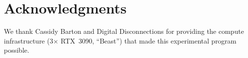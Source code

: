\documentclass[11pt,letterpaper]{article}
\begin{document}


















% 

\section*{Acknowledgments}

We thank Cassidy Barton and Digital Disconnections for providing the compute infrastructure (3$\times$ RTX~3090, ``Beast'') that made this experimental program possible.




\appendix

\end{document}
